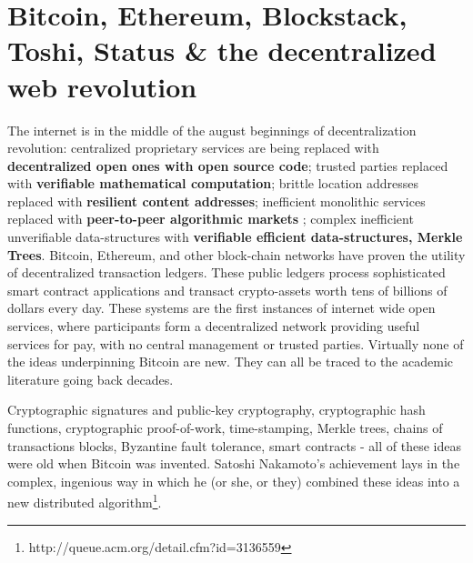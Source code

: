 \documentclass{article}
\begin{document}
\section{Bitcoin, Ethereum, Blockstack, Toshi, Status \& the decentralized web revolution}
 The internet is in the middle of the august beginnings of decentralization revolution: centralized proprietary services are being replaced with \textbf{decentralized open ones with open source code}; trusted parties replaced with \textbf{verifiable mathematical computation}; brittle location addresses replaced with \textbf{resilient content addresses}; inefficient monolithic services replaced with \textbf{peer-to-peer algorithmic markets} ; complex inefficient unverifiable data-structures with \textbf{verifiable efficient data-structures, Merkle Trees}. Bitcoin, Ethereum, and other block-chain networks have proven the utility of decentralized transaction ledgers. These public ledgers process sophisticated smart contract applications and transact crypto-assets worth tens of billions of dollars every day. These systems are the first instances of internet wide open services, where participants form a decentralized network providing useful services for pay, with no central management or trusted parties.
Virtually none of the ideas underpinning Bitcoin are new. They can all be traced to the academic literature going back decades.

 Cryptographic signatures and public-key cryptography, cryptographic hash functions, cryptographic proof-of-work, time-stamping, Merkle trees, chains of transactions blocks, Byzantine fault tolerance, smart contracts - all of these ideas were old when Bitcoin was invented.
 Satoshi Nakamoto's achievement lays in the complex, ingenious way in which he (or she, or they) combined these ideas into a new distributed algorithm\footnote{http://queue.acm.org/detail.cfm?id=3136559}.
 

\end{document}
